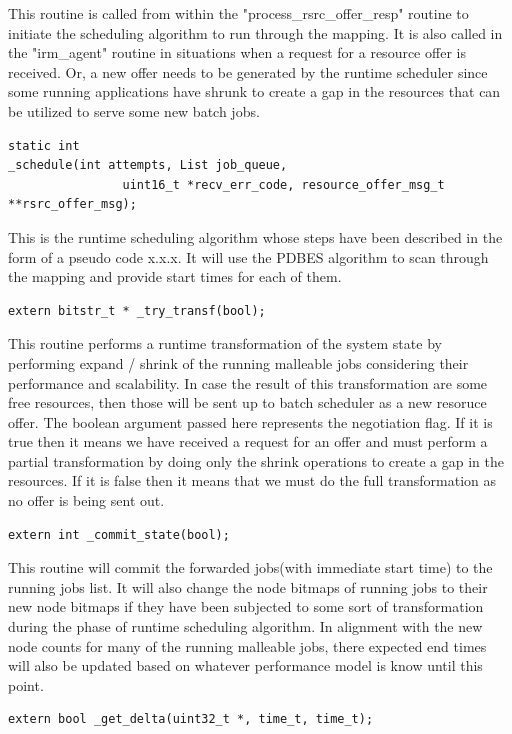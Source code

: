 This routine is called from within the "process\_rsrc\_offer\_resp" routine to initiate the scheduling algorithm to run through the mapping. It is also called in the "irm\_agent" routine in situations when a request for a resource offer is received. Or, a new offer needs to be generated by the runtime scheduler since some running applications have shrunk to create a gap in the resources that can be utilized to serve some new batch jobs.\\
\begin{lstlisting}[mathescape,frame=single]
static int 
_schedule(int attempts, List job_queue,
                uint16_t *recv_err_code, resource_offer_msg_t **rsrc_offer_msg);
\end{lstlisting}
This is the runtime scheduling algorithm whose steps have been described in the form of a pseudo code x.x.x. It will use the PDBES algorithm to scan through the mapping and provide start times for each of them.\\
\begin{lstlisting}[mathescape,frame=single]
extern bitstr_t * _try_transf(bool);
\end{lstlisting}
This routine performs a runtime transformation of the system state by performing expand / shrink of the running malleable jobs considering their performance and scalability. In case the result of this transformation are some free resources, then those will be sent up to batch scheduler as a new resoruce offer. The boolean argument passed here represents the negotiation flag. If it is true then it means we have received a request for an offer and must perform a partial transformation by doing only the shrink operations to create a gap in the resources. If it is false then it means that we must do the full transformation as no offer is being sent out.\\
\begin{lstlisting}[mathescape,frame=single]
extern int _commit_state(bool);
\end{lstlisting}
This routine will commit the forwarded jobs(with immediate start time) to the running jobs list. It will also change the node bitmaps of running jobs to their new node bitmaps if they have been subjected to some sort of transformation during the phase of runtime scheduling algorithm. In alignment with the new node counts for many of the running malleable jobs, there expected end times will also be updated based on whatever performance model is know until this point.\\
\begin{lstlisting}[mathescape,frame=single]
extern bool _get_delta(uint32_t *, time_t, time_t);
\end{lstlisting}
